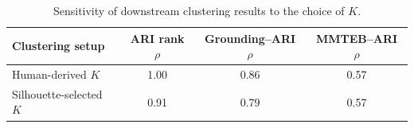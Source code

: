 \begin{table}[t]
\centering
\small
\caption{Sensitivity of downstream clustering results to the choice of $K$.}
\label{tab:k-sensitivity}
\begin{tabular}{lccc}
\toprule
\textbf{Clustering setup} & \textbf{ARI rank $\rho$} & \textbf{Grounding--ARI $\rho$} & \textbf{MMTEB--ARI $\rho$} \\
\midrule
Human-derived $K$ & 1.00 & 0.86 & 0.57 \\
Silhouette-selected $K$ & 0.91 & 0.79 & 0.57 \\
\bottomrule
\end{tabular}
\end{table}
